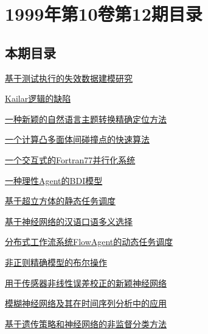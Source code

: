 \documentclass[a4paper]{article}
\begin{document}
\section{\textbf{1999年第10卷第12期目录}}
\subsection{本期目录}
\href{http://www.jos.org.cn/ch/reader/download_pdf.aspx?file_no=19991201&year_id=1999&quarter_id=12&falg=1}{基于测试执行的失效数据建模研究}

\href{http://www.jos.org.cn/ch/reader/download_pdf.aspx?file_no=19991202&year_id=1999&quarter_id=12&falg=1}{Kailar逻辑的缺陷}

\href{http://www.jos.org.cn/ch/reader/download_pdf.aspx?file_no=19991203&year_id=1999&quarter_id=12&falg=1}{一种新颖的自然语言主题转换精确定位方法}

\href{http://www.jos.org.cn/ch/reader/download_pdf.aspx?file_no=19991204&year_id=1999&quarter_id=12&falg=1}{一个计算凸多面体间碰撞点的快速算法}

\href{http://www.jos.org.cn/ch/reader/download_pdf.aspx?file_no=19991205&year_id=1999&quarter_id=12&falg=1}{一个交互式的Fortran77并行化系统}

\href{http://www.jos.org.cn/ch/reader/download_pdf.aspx?file_no=19991206&year_id=1999&quarter_id=12&falg=1}{一种理性Agent的BDI模型}

\href{http://www.jos.org.cn/ch/reader/download_pdf.aspx?file_no=19991207&year_id=1999&quarter_id=12&falg=1}{基于超立方体的静态任务调度}

\href{http://www.jos.org.cn/ch/reader/download_pdf.aspx?file_no=19991208&year_id=1999&quarter_id=12&falg=1}{基于神经网络的汉语口语多义选择}

\href{http://www.jos.org.cn/ch/reader/download_pdf.aspx?file_no=19991209&year_id=1999&quarter_id=12&falg=1}{分布式工作流系统FlowAgent的动态任务调度}

\href{http://www.jos.org.cn/ch/reader/download_pdf.aspx?file_no=19991210&year_id=1999&quarter_id=12&falg=1}{非正则精确模型的布尔操作}

\href{http://www.jos.org.cn/ch/reader/download_pdf.aspx?file_no=19991211&year_id=1999&quarter_id=12&falg=1}{用于传感器非线性误差校正的新颖神经网络}

\href{http://www.jos.org.cn/ch/reader/download_pdf.aspx?file_no=19991212&year_id=1999&quarter_id=12&falg=1}{模糊神经网络及其在时间序列分析中的应用}

\href{http://www.jos.org.cn/ch/reader/download_pdf.aspx?file_no=19991213&year_id=1999&quarter_id=12&falg=1}{基于遗传策略和神经网络的非监督分类方法}
\end{document}
